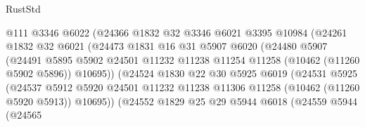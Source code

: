 \begin{lexlean}{RustStd}
\begin{coremodule}
                              @111
                              @3346
                              @6022
                              (@24366
                                @1832
                                @32
                                @3346
                                @6021
                                @3395
                                @10984
                                (@24261
                                  @1832
                                  @32
                                  @6021
                                  (@24473
                                    @1831
                                    @16
                                    @31
                                    @5907
                                    @6020
                                    (@24480
                                      @5907
                                      (@24491
                                        @5895
                                        @5902
                                        @24501
                                        @11232
                                        @11238
                                        @11254
                                        @11258
                                        (@10462 (@11260 @5902 @5896))
                                        @10695))
                                    (@24524
                                      @1830
                                      @22
                                      @30
                                      @5925
                                      @6019
                                      (@24531
                                        @5925
                                        (@24537
                                          @5912
                                          @5920
                                          @24501
                                          @11232
                                          @11238
                                          @11306
                                          @11258
                                          (@10462 (@11260 @5920 @5913))
                                          @10695))
                                      (@24552
                                        @1829
                                        @25
                                        @29
                                        @5944
                                        @6018
                                        (@24559
                                          @5944
                                          (@24565

\end{coremodule}
\end{lexlean}

